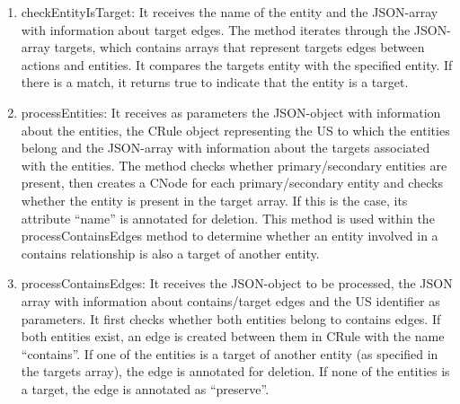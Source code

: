 \begin{enumerate}
	\item checkEntityIsTarget: It receives the name of the entity and the JSON-array with information about target edges. The method iterates through the JSON-array targets, which contains arrays that represent targets edges between actions and entities. It compares the targets entity with the specified entity. If there is a match, it returns true to indicate that the entity is a target.
	\item processEntities: It receives as parameters the JSON-object with information about the entities, the CRule object representing the US to which the entities belong and the JSON-array with information about the targets associated with the entities. The method checks whether primary/secondary entities are present, then creates a CNode for each primary/secondary entity and checks whether the entity is present in the target array. If this is the case, its attribute \enquote{name} is annotated for deletion. This method is used within the processContainsEdges method to determine whether an entity involved in a contains relationship is also a target of another entity.
	\item processContainsEdges: It receives the JSON-object to be processed, the JSON array with information about contains/target edges and the US identifier as parameters. It first checks whether both entities belong to contains edges. If both entities exist, an edge is created between them in CRule with the name \enquote{contains}. If one of the entities is a target of another entity (as specified in the targets array), the edge is annotated for deletion. If none of the entities is a target, the edge is annotated as \enquote{preserve}.
\end{enumerate}


 
%
